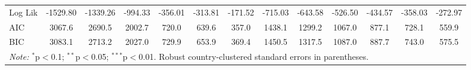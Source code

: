 \begin{table}[tb]
{\begin{tabular}{@{\extracolsep{5pt}}lcccccccccccc}
Log Lik	&	-1529.80	&	-1339.26	&	-994.33	&	-356.01	&	-313.81	&	-171.52	&	-715.03	&	-643.58	&	-526.50	&	-434.57	&	-358.03	&	-272.97	\\
AIC	&	3067.6	&	2690.5	&	2002.7	&	720.0	&	639.6	&	357.0	&	1438.1	&	1299.2	&	1067.0	&	877.1	&	728.1	&	559.9	\\
BIC	&	3083.1	&	2713.2	&	2027.0	&	729.9	&	653.9	&	369.4	&	1450.5	&	1317.5	&	1087.0	&	887.7	&	743.0	&	575.5	\\
\bottomrule																									
\multicolumn{13}{l}{\textit{Note:}  $^{*}$p$<$0.1; $^{**}$p$<$0.05; $^{***}$p$<$0.01.  Robust country-clustered standard errors in parentheses.} 																									\\
\end{tabular}%
}																									
\end{table}																									
